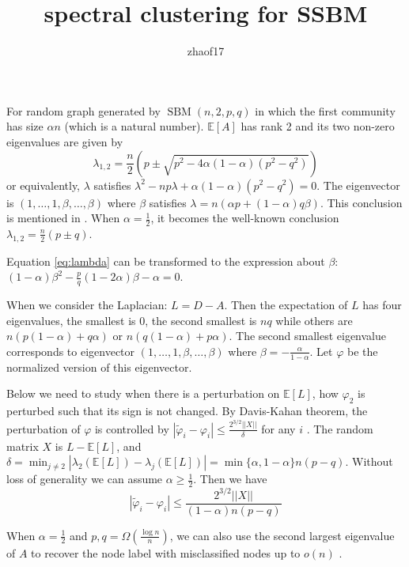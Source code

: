 \documentclass{article}
\title{spectral clustering for SSBM}
\author{zhaof17 }
\DeclareMathOperator{\SBM}{SBM}
\begin{document}
\maketitle

For random graph generated by $\SBM(n,2,p,q)$ in which the first community
has size $\alpha n$ (which is a natural number). $\mathbb{E}[A]$ has rank 2 and its
two non-zero eigenvalues are given by
\begin{equation}\label{eq:lambda}
    \lambda_{1,2} = \frac{n}{2}(p \pm \sqrt{p^2-4\alpha(1-\alpha)(p^2-q^2)})
\end{equation}
or equivalently, $\lambda$ satisfies
$ \lambda^2 - np\lambda + \alpha(1-\alpha)(p^2-q^2) =0$.
The eigenvector is $(1,\dots, 1, \beta, \dots, \beta)$ where
$\beta$ satisfies
$\lambda = n(\alpha p + (1-\alpha)q\beta)$.
This conclusion is mentioned in \cite{yun14}.
When $\alpha = \frac{1}{2}$, it becomes the well-known conclusion $\lambda_{1,2}=\frac{n}{2}(p\pm q)$.

Equation \ref{eq:lambda} can be transformed to
the expression about $\beta$: $(1-\alpha)\beta^2-\frac{p}{q}(1-2\alpha)\beta - \alpha=0$.

When we consider the Laplacian: $L=D-A$. Then
the expectation of $L$ has four eigenvalues, the smallest is 0,
the second smallest is $nq$
while others are $n(p(1-\alpha) + q\alpha)$
or $n(q(1-\alpha) + p\alpha)$.
The second smallest eigenvalue corresponds to eigenvector
$(1, \dots, 1, \beta, \dots, \beta)$ where $\beta=-\frac{\alpha}{1-\alpha}$. Let $\varphi$
be the normalized version of this eigenvector.

Below we need to study when there is a perturbation on $\mathbb{E}[L]$,
how $\varphi_2$ is perturbed such that its sign is not changed.
By Davis-Kahan theorem, the perturbation of $\varphi$
is controlled by
$ |\tilde{\varphi}_i - \varphi_i |
\leq \frac{2^{3/2} ||X||}{\delta}$ for any $i$ \cite{math236-16}.
The random matrix $X$ is $L-\mathbb{E}[L]$, and 
$\delta = \min_{j\neq 2}|\lambda_2(\mathbb{E}[L]) - \lambda_j(\mathbb{E}[L])| = \min\{\alpha, 1-\alpha\} n(p-q)$.
Without loss of generality we can assume $\alpha \geq \frac{1}{2}$. Then we have
\begin{equation}
    |\tilde{\varphi}_i - \varphi_i |
\leq \frac{2^{3/2} ||X||}{(1-\alpha)n(p-q)}
\end{equation}

When $\alpha=\frac{1}{2}$ and $p,q=\Omega(\frac{\log n}{n})$, we can also use the
second largest eigenvalue of
$A$ to recover the node label
with misclassified nodes up to $o(n)$ \cite{mossel}.
\end{document}
